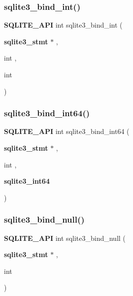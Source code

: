 \mbox{\label{sqlite3_8h_aa6d5cc21ec0004b2e0bdce3395590aad}} 
\subsubsection{sqlite3\_bind\_int()}
{\footnotesize\ttfamily \textbf{ S\+Q\+L\+I\+T\+E\+\_\+\+A\+PI} int sqlite3\+\_\+bind\+\_\+int (\begin{DoxyParamCaption}\item[{\textbf{ sqlite3\+\_\+stmt} $\ast$}]{,  }\item[{int}]{,  }\item[{int}]{ }\end{DoxyParamCaption})}

\mbox{\label{sqlite3_8h_af77e2729923f2621852202e1c23788c6}} 
\subsubsection{sqlite3\_bind\_int64()}
{\footnotesize\ttfamily \textbf{ S\+Q\+L\+I\+T\+E\+\_\+\+A\+PI} int sqlite3\+\_\+bind\+\_\+int64 (\begin{DoxyParamCaption}\item[{\textbf{ sqlite3\+\_\+stmt} $\ast$}]{,  }\item[{int}]{,  }\item[{\textbf{ sqlite3\+\_\+int64}}]{ }\end{DoxyParamCaption})}

\mbox{\label{sqlite3_8h_a6649c57d2c7b13ba6b506f6f79da85aa}} 
\subsubsection{sqlite3\_bind\_null()}
{\footnotesize\ttfamily \textbf{ S\+Q\+L\+I\+T\+E\+\_\+\+A\+PI} int sqlite3\+\_\+bind\+\_\+null (\begin{DoxyParamCaption}\item[{\textbf{ sqlite3\+\_\+stmt} $\ast$}]{,  }\item[{int}]{ }\end{DoxyParamCaption})}

\mbox{\label{sqlite3_8h_ace70e1a0095b7fd9852a6dd263c964a1}} 
